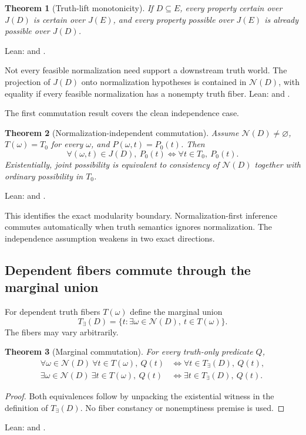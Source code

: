 \documentclass[11pt]{article}
\newtheorem{theorem}{Theorem}[section]
\theoremstyle{definition}
\theoremstyle{remark}
\newcommand{\Feas}{\mathcal N}
\begin{document}
\begin{theorem}[Truth-lift monotonicity]
If $D\subseteq E$, every property certain over $J(D)$ is certain over $J(E)$,
and every property possible over $J(E)$ is already possible over $J(D)$.
\end{theorem}
\noindent Lean:  and
.

Not every feasible normalization need support a downstream truth world.  The
projection of $J(D)$ onto normalization hypotheses is contained in
$\Feas(D)$, with equality if every feasible normalization has a nonempty truth
fiber.  Lean:  and
.

The first commutation result covers the clean independence case.

\begin{theorem}[Normalization-independent commutation]
Assume $\Feas(D)\ne\varnothing$, $T(\omega)=T_0$ for every $\omega$, and
$P(\omega,t)=P_0(t)$.  Then
\[
  \forall(\omega,t)\in J(D),\ P_0(t)
  \Longleftrightarrow
  \forall t\in T_0,\ P_0(t).
\]
Existentially, joint possibility is equivalent to consistency of
$\Feas(D)$ together with ordinary possibility in $T_0$.
\end{theorem}
\noindent Lean:  and
.

This identifies the exact modularity boundary.  Normalization-first inference
commutes automatically when truth semantics ignores normalization.  The
independence assumption weakens in two exact directions.

\subsection{Dependent fibers commute through the marginal union}

For dependent truth fibers $T(\omega)$ define the marginal union
\[
  T_\exists(D)=\{t:\exists \omega\in\Feas(D),\ t\in T(\omega)\}.
\]
The fibers may vary arbitrarily.

\begin{theorem}[Marginal commutation]
For every truth-only predicate $Q$,
\begin{align*}
 \forall \omega\in\Feas(D)\ \forall t\in T(\omega),\ Q(t)
 &\Longleftrightarrow \forall t\in T_\exists(D),\ Q(t),\\
 \exists \omega\in\Feas(D)\ \exists t\in T(\omega),\ Q(t)
 &\Longleftrightarrow \exists t\in T_\exists(D),\ Q(t).
\end{align*}
\end{theorem}
\begin{proof}
Both equivalences follow by unpacking the existential witness in the definition
of $T_\exists(D)$.  No fiber constancy or nonemptiness premise is used.
\end{proof}
\noindent Lean:  and
.
\end{document}
